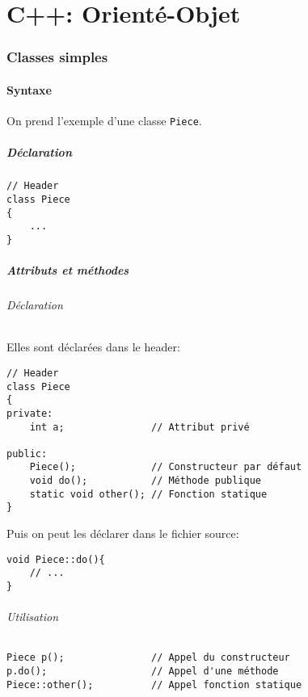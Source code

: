 \documentclass[10pt,a4paper,french]{article}
\let\oldpart\part
\renewcommand\part{\newpage\oldpart}
\begin{document}
\part{C++: Orienté-Objet}

\section{Classes simples}

\subsection{Syntaxe}

On prend l'exemple d'une classe {\tt Piece}.

\subsubsection{Déclaration}

\begin{verbatim}
// Header
class Piece
{
    ...
}
\end{verbatim}

\subsubsection{Attributs et méthodes}

\paragraph{Déclaration}
Elles sont déclarées dans le header:
\begin{verbatim}
// Header
class Piece
{
private:
    int a;               // Attribut privé

public:
    Piece();             // Constructeur par défaut
    void do();           // Méthode publique
    static void other(); // Fonction statique
}
\end{verbatim}

Puis on peut les déclarer dans le fichier source:
\begin{verbatim}
void Piece::do(){
    // ...
}
\end{verbatim}

\paragraph{Utilisation}
\begin{verbatim}
Piece p();               // Appel du constructeur
p.do();                  // Appel d'une méthode
Piece::other();          // Appel fonction statique
\end{verbatim}
\end{document}
